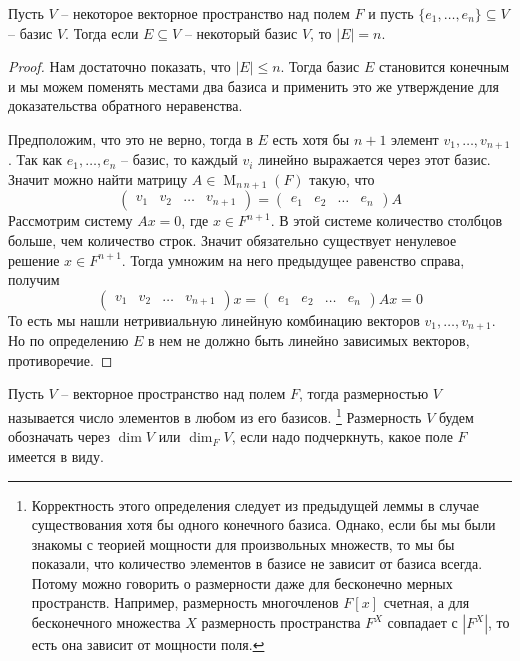 \begin{claim}
Пусть $V$ -- некоторое векторное пространство над полем $F$ и пусть $\{e_1,\ldots,e_n\}\subseteq V$ -- базис $V$.
Тогда если $E\subseteq V$ -- некоторый базис $V$, то $|E| = n$.
\end{claim}
\begin{proof}
Нам достаточно показать, что $|E|\leqslant n$.
Тогда базис $E$ становится конечным и мы можем поменять местами два базиса и применить это же утверждение для доказательства обратного неравенства.

Предположим, что это не верно, тогда в $E$ есть хотя бы $n+1$ элемент $v_1,\ldots, v_{n+1}$.
Так как $e_1,\ldots, e_n$ -- базис, то каждый $v_i$ линейно выражается через этот базис.
Значит можно найти матрицу $A\in \operatorname{M}_{n\,n+1}(F)$ такую, что
\[
\begin{pmatrix}
{v_1}&{v_2}&{\ldots}&{v_{n+1}}
\end{pmatrix}
=
\begin{pmatrix}
{e_1}&{e_2}&{\ldots}&{e_n}
\end{pmatrix}
A
\]
Рассмотрим систему $Ax = 0$, где $x\in F^{n+1}$.
В этой системе количество столбцов больше, чем количество строк.
Значит обязательно существует ненулевое решение $x\in F^{n+1}$.
Тогда умножим на него предыдущее равенство справа, получим
\[
\begin{pmatrix}
{v_1}&{v_2}&{\ldots}&{v_{n+1}}
\end{pmatrix}x
=
\begin{pmatrix}
{e_1}&{e_2}&{\ldots}&{e_n}
\end{pmatrix}
Ax=
0
\]
То есть мы нашли нетривиальную линейную комбинацию векторов $v_1,\ldots, v_{n+1}$.
Но по определению $E$ в нем не должно быть линейно зависимых векторов, противоречие.
\end{proof}

Пусть $V$ -- векторное пространство над полем $F$, тогда размерностью $V$ называется число элементов в любом из его базисов.%
\footnote{Корректность этого определения следует из предыдущей леммы в случае существования хотя бы одного конечного базиса.
Однако, если бы мы были знакомы с теорией мощности для произвольных множеств, то мы бы показали, что количество элементов в базисе не зависит от базиса всегда.
Потому можно говорить о размерности даже для бесконечно мерных пространств.
Например, размерность многочленов $F[x]$ счетная, а для бесконечного множества $X$ размерность пространства $F^X$ совпадает с $|F^X|$, то есть она зависит от мощности поля.}
Размерность $V$ будем обозначать через $\dim V$ или $\dim_F V$, если надо подчеркнуть, какое поле $F$ имеется в виду.

